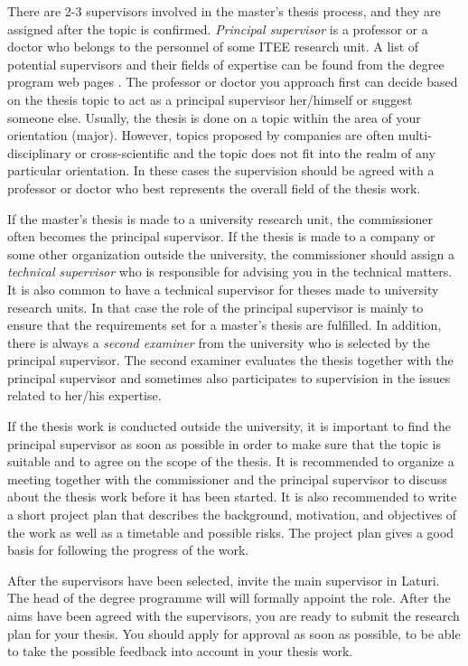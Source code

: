 There are 2-3 supervisors involved in the master’s thesis process, and they are assigned after the topic is confirmed. \textit{Principal supervisor} is a professor or a  doctor who belongs to the personnel of some ITEE research unit. A list of potential supervisors and their fields of expertise can be found from the degree program web pages \cite{mscstudies}. The professor or doctor you approach first can decide based on  the thesis topic to act as a principal supervisor her/himself or suggest someone else.  Usually, the thesis is done on a topic within the area of your orientation (major).  However, topics proposed by companies are often multi-disciplinary or cross-scientific  and the topic does not fit into the realm of any particular orientation. In these cases  the supervision should be agreed with a professor or doctor who best represents the  overall field of the thesis work.

If the master’s thesis is made to a university research unit, the commissioner often becomes the principal supervisor. If the thesis is made to a company or some other organization outside the university, the commissioner should assign a \textit{technical supervisor} who is responsible for advising you in the technical matters. It is also common to have a technical supervisor for theses made to university research units. In that case the role of the principal supervisor is mainly to ensure that the requirements set for a master’s thesis are fulfilled. In addition, there is always a \textit{second examiner} from the university who is selected by the principal supervisor. The second examiner evaluates the thesis together with the principal supervisor and sometimes also participates to supervision in the issues related to her/his expertise.

If the thesis work is conducted outside the university, it is important to find the principal supervisor as soon as possible in order to make sure that the topic is suitable and to agree on the scope of the thesis. It is recommended to organize a meeting together with the commissioner and the principal supervisor to discuss about the thesis work before it has been started. It is also recommended to write a short project plan that describes the background, motivation, and objectives of the work as well as a timetable and possible risks. The project plan gives a good basis for following the progress of the work.

After the supervisors have been selected, invite the main supervisor in Laturi. The head of the degree programme will will formally appoint the role. After the aims have been agreed with the supervisors, you are ready to submit the research plan for your thesis.  You should apply for approval as soon as possible, to be able to take the possible feedback into account in your thesis work. 

